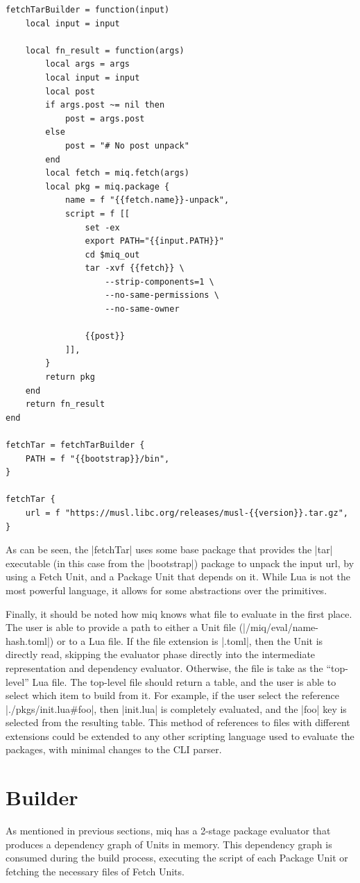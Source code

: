 \begin{verbatim}
fetchTarBuilder = function(input)
    local input = input

    local fn_result = function(args)
        local args = args
        local input = input
        local post
        if args.post ~= nil then
            post = args.post
        else
            post = "# No post unpack"
        end
        local fetch = miq.fetch(args)
        local pkg = miq.package {
            name = f "{{fetch.name}}-unpack",
            script = f [[
                set -ex
                export PATH="{{input.PATH}}"
                cd $miq_out
                tar -xvf {{fetch}} \
                    --strip-components=1 \
                    --no-same-permissions \
                    --no-same-owner

                {{post}}
            ]],
        }
        return pkg
    end
    return fn_result
end

fetchTar = fetchTarBuilder {
    PATH = f "{{bootstrap}}/bin",
}

fetchTar {
    url = f "https://musl.libc.org/releases/musl-{{version}}.tar.gz",
}
\end{verbatim}

As can be seen, the |fetchTar| uses some base package that
provides the |tar| executable (in this case from the
|bootstrap|) package to unpack the input url, by using a
Fetch Unit, and a Package Unit that depends on it. While Lua
is not the most powerful language, it allows for some
abstractions over the primitives.

Finally, it should be noted how miq knows what file to
evaluate in the first place. The user is able to provide a
path to either a Unit file (|/miq/eval/name-hash.toml|) or
to a Lua file. If the file extension is |.toml|, then the
Unit is directly read, skipping the evaluator phase directly
into the intermediate representation and dependency
evaluator. Otherwise, the file is take as the ``top-level''
Lua file. The top-level file should return a table, and the
user is able to select which item to build from it. For
example, if the user select the reference
|./pkgs/init.lua#foo|, then |init.lua| is completely
evaluated, and the |foo| key is selected from the resulting
table. This method of references to files with different
extensions could be extended to any other scripting language
used to evaluate the packages, with minimal changes to the
\ac{CLI} parser.


\section{Builder}
\label{sec:builder}
As mentioned in previous sections, miq has a 2-stage package
evaluator that produces a dependency graph of Units in
memory. This dependency graph is consumed during the build
process, executing the script of each Package Unit or
fetching the necessary files of Fetch Units.

